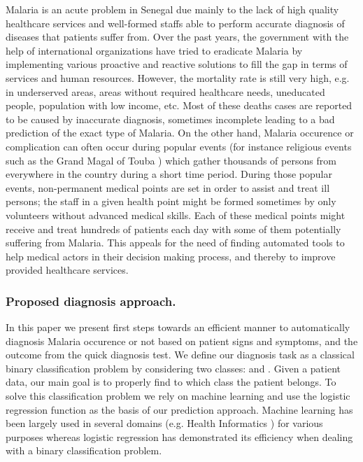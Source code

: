 Malaria is an acute problem in Senegal  due mainly to the lack of high quality healthcare services and well-formed
staffs able to perform accurate diagnosis of diseases that patients suffer from. Over the past years, the government with 
the help of international organizations have tried to eradicate Malaria by implementing various proactive and reactive solutions 
to fill the gap in terms of services and human resources. However, the mortality rate is still very high, e.g. in underserved areas,
areas without required healthcare needs, uneducated people, population with low income, etc. Most of these deaths cases are reported to be caused by inaccurate diagnosis, sometimes 
incomplete leading to a bad prediction of the exact type of Malaria.
On the other hand, Malaria occurence or complication can often occur during  popular events (for instance religious events such as the Grand Magal of Touba \cite{So17})
which gather thousands of persons from everywhere in the country during a short time period. During those popular events, non-permanent medical points are set in order
to assist and treat ill persons; the staff in a given health point might be formed sometimes by only volunteers without advanced medical skills. Each of these medical 
points might receive and treat hundreds of patients each day with some of them potentially suffering from Malaria. 
This appeals for the need of finding automated tools to help medical actors in their decision making process, and thereby to improve provided 
healthcare services.   

\subsubsection{Proposed diagnosis approach.}
In this paper we present first steps towards an efficient manner to automatically diagnosis Malaria occurence or not based on patient signs and symptoms,
and the outcome from the quick diagnosis test. We define our diagnosis task as a classical binary classification problem by considering two classes:  and .
Given a patient data, our main goal is to properly find to which class the patient belongs. To solve this classification problem we rely on machine learning and use the logistic regression
function as the basis of our prediction approach. Machine learning has been largely used in several domains (e.g. Health Informatics  \cite{Du13}) for various purposes whereas logistic regression has demonstrated its efficiency when dealing with a binary classification problem. 
 
